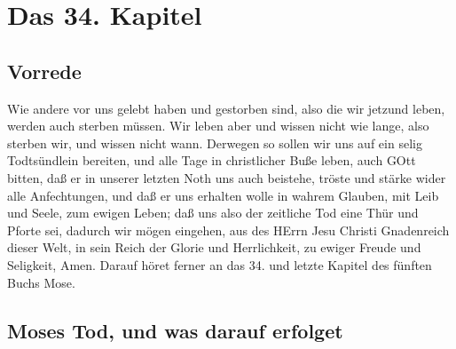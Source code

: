 \chapter{Das 34. Kapitel}

\section{Vorrede}

Wie andere vor uns gelebt haben und gestorben sind, also die wir jetzund leben, werden auch sterben müssen. Wir leben aber und wissen nicht wie lange, also sterben wir, und wissen nicht wann. Derwegen so sollen wir uns auf ein selig Todtsündlein bereiten, und alle Tage in christlicher Buße leben, auch GOtt bitten, daß er in unserer letzten Noth uns auch beistehe, tröste und stärke wider alle Anfechtungen, und daß er uns erhalten wolle in wahrem Glauben, mit Leib und Seele, zum ewigen Leben; daß uns also der zeitliche Tod eine Thür und Pforte sei, dadurch wir mögen eingehen, aus des HErrn Jesu Christi Gnadenreich dieser Welt, in sein Reich der Glorie und Herrlichkeit, zu ewiger Freude und Seligkeit, Amen. Darauf höret ferner an das 34. und letzte Kapitel des fünften Buchs Mose.

\section{Moses Tod, und was darauf erfolget}
